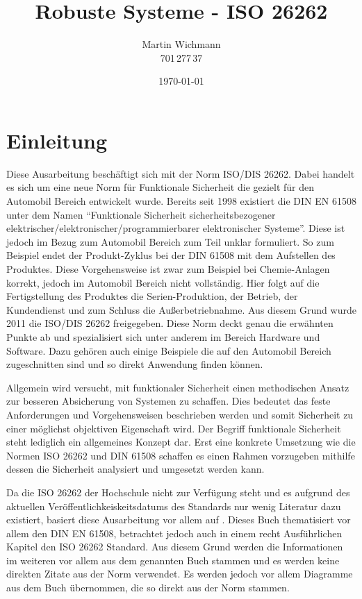 \documentclass[a4paper,DIV=calc,ngerman]{scrartcl}
\begin{document}
\titlehead{}
\title{Robuste Systeme - ISO 26262}
\author{Martin Wichmann\\701\,277\,37}
\date{\today}
\maketitle

\tableofcontents

\newpage

\section{Einleitung}
\label{sec:Einleitung}
Diese Ausarbeitung beschäftigt sich mit der Norm ISO/DIS 26262. Dabei handelt es sich um eine neue Norm für Funktionale Sicherheit die gezielt für den Automobil Bereich entwickelt wurde. Bereits seit 1998 existiert die DIN EN 61508 unter dem Namen "`Funktionale Sicherheit sicherheitsbezogener elektrischer/elektronischer/programmierbarer elektronischer Systeme"'. Diese ist jedoch im Bezug zum Automobil Bereich zum Teil unklar formuliert. So zum Beispiel endet der Produkt-Zyklus bei der DIN 61508 mit dem Aufstellen des Produktes. Diese Vorgehensweise ist zwar zum Beispiel bei Chemie-Anlagen korrekt, jedoch im Automobil Bereich nicht vollständig. Hier folgt auf die Fertigstellung des Produktes die Serien-Produktion, der Betrieb, der Kundendienst und zum Schluss die Außerbetriebnahme. Aus diesem Grund wurde 2011 die ISO/DIS 26262 freigegeben. Diese Norm deckt genau die erwähnten Punkte ab und spezialisiert sich unter anderem im Bereich Hardware und Software. Dazu gehören auch einige Beispiele die auf den Automobil Bereich zugeschnitten sind und so direkt Anwendung finden können.

Allgemein wird versucht, mit funktionaler Sicherheit einen methodischen Ansatz zur besseren Absicherung von Systemen zu schaffen. Dies bedeutet das feste Anforderungen und Vorgehensweisen beschrieben werden und somit Sicherheit zu einer möglichst objektiven Eigenschaft wird. Der Begriff funktionale Sicherheit steht lediglich ein allgemeines Konzept dar. Erst eine konkrete Umsetzung wie die Normen ISO 26262 und DIN 61508 schaffen es einen Rahmen vorzugeben mithilfe dessen die Sicherheit analysiert und umgesetzt werden kann.

Da die ISO 26262 der Hochschule nicht zur Verfügung steht und es aufgrund des aktuellen Veröffentlichkeiskeitsdatums des Standards nur wenig Literatur dazu existiert, basiert diese Ausarbeitung vor allem auf \cite{1}. Dieses Buch thematisiert vor allem den DIN EN 61508, betrachtet jedoch auch in einem recht Ausführlichen Kapitel den ISO 26262 Standard. Aus diesem Grund werden die Informationen im weiteren vor allem aus dem genannten Buch stammen und es werden keine direkten Zitate aus der Norm verwendet. Es werden jedoch vor allem Diagramme aus dem Buch übernommen, die so direkt aus der Norm stammen.
\end{document}
